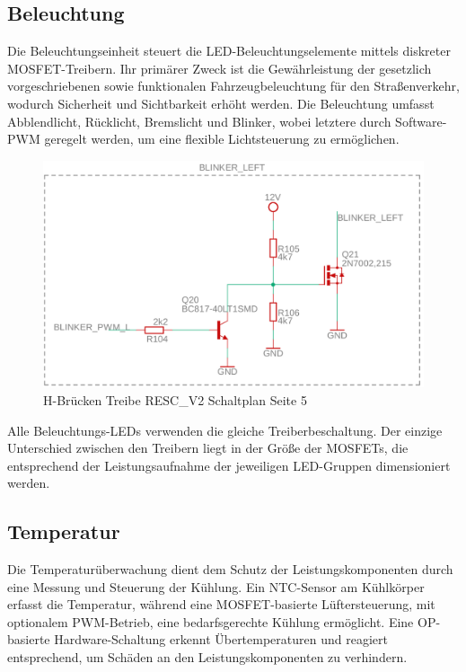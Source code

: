 \documentclass[paper=a4,11pt]{scrreprt}
\begin{document}
\subsection{Beleuchtung}
Die Beleuchtungseinheit steuert die LED-Beleuchtungselemente mittels diskreter MOSFET-Treibern. Ihr primärer Zweck ist die Gewährleistung der gesetzlich vorgeschriebenen sowie funktionalen Fahrzeugbeleuchtung für den Straßenverkehr, wodurch Sicherheit und Sichtbarkeit erhöht werden. Die Beleuchtung umfasst Abblendlicht, Rücklicht, Bremslicht und Blinker, wobei letztere durch Software-PWM geregelt werden, um eine flexible Lichtsteuerung zu ermöglichen.

\begin{figure}[ht]
\begin{center}
\includegraphics[width=12cm]{Bilder/Blinker.PNG}
\caption{H-Brücken Treibe RESC\_V2 Schaltplan Seite 5}
\label{blinker}
\end{center}
\end{figure}

Alle Beleuchtungs-LEDs verwenden die gleiche Treiberbeschaltung. Der einzige Unterschied zwischen den Treibern liegt in der Größe der MOSFETs, die entsprechend der Leistungsaufnahme der jeweiligen LED-Gruppen dimensioniert werden.
\newpage
\subsection{Temperatur}
Die Temperaturüberwachung dient dem Schutz der Leistungskomponenten durch eine Messung und  Steuerung der Kühlung. Ein NTC-Sensor am Kühlkörper erfasst die Temperatur, während eine MOSFET-basierte Lüftersteuerung, mit optionalem PWM-Betrieb, eine bedarfsgerechte Kühlung ermöglicht. Eine OP-basierte Hardware-Schaltung erkennt Übertemperaturen und reagiert entsprechend, um Schäden an den Leistungskomponenten zu verhindern.
\\
\end{document}
